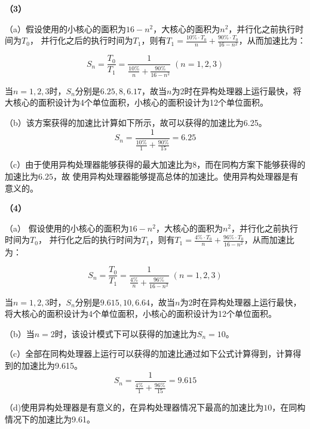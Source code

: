 \documentclass[12pt]{article}
\begin{document}
\textbf{（3）}

	（a）假设使用的小核心的面积为$16-n^{2}$，大核心的面积为$n^{2}$，并行化之前执行时间为$T_{0}$，
	并行化之后的执行时间为$T_1$，则有$T_1 = \frac{ 10\% \cdot T_0}{n}+\frac{90\% \cdot T_0}{16-n^{2}}$，从而加速比为：

	\begin{equation}
		S_{n} = \frac{T_0}{T_1}=\frac{1}{\frac{ 10\%}{n}+\frac{90\%}{16-n^{2}}}\;(n=1,2,3)
	\end{equation}

	当$n=1,2,3$时，$S_n$分别是$6.25,8,6.17$，故当$n$为2时在异构处理器上运行最快，将大核心的面积设计为4个单位面积，小核心的面积设计为12个单位面积。

	（b）该方案获得的加速比计算如下所示，故可以获得的加速比为6.25。
	\begin{equation}
		S_n=\frac{1}{\frac{ 10\%}{1}+\frac{90\%}{15}}=6.25 
	\end{equation}

	（c）由于使用异构处理器能够获得的最大加速比为$8$，而在同构方案下能够获得的加速比为$6.25$，故
	使用异构处理器能够提高总体的加速比。使用异构处理器是有意义的。

	
\textbf{（4）}

	
	（a） 假设使用的小核心的面积为$16-n^{2}$，大核心的面积为$n^{2}$，并行化之前执行时间为$T_{0}$，
	并行化之后的执行时间为$T_1$，则有$T_1 = \frac{ 4\% \cdot T_0}{n}+\frac{96\% \cdot T_0}{16-n^{2}}$，从而加速比为：

	\begin{equation}
		S_{n} = \frac{T_0}{T_1}=\frac{1}{\frac{ 4\%}{n}+\frac{96\%}{16-n^{2}}}\;(n=1,2,3)
	\end{equation}

	当$n=1,2,3$时，$S_n$分别是$9.615,10,6.64$，故当$n$为2时在异构处理器上运行最快，将大核心的面积设计为4个单位面积，小核心的面积设计为12个单位面积。

	（b）当$n=2$时，该设计模式下可以获得的加速比为$S_n=10$。

	（c）全部在同构处理器上运行可以获得的加速比通过如下公式计算得到，计算得到的加速比为9.615。
	\begin{equation}
		S_n=\frac{1}{\frac{ 4\%}{1}+\frac{96\%}{15}}=9.615
	\end{equation}

	（d)使用异构处理器是有意义的，在异构处理器情况下最高的加速比为$10$，在同构情况下的加速比为9.61。
\end{document}
